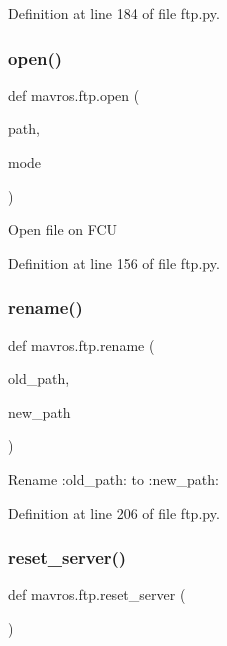 Definition at line 184 of file ftp.\+py.

\mbox{\label{namespacemavros_1_1ftp_a6b481ccf77a4b30ba0213d379bac1cd5}} 
\subsubsection{\texorpdfstring{open()}{open()}}
{\footnotesize\ttfamily def mavros.\+ftp.\+open (\begin{DoxyParamCaption}\item[{}]{path,  }\item[{}]{mode }\end{DoxyParamCaption})}

\begin{DoxyVerb}Open file on FCU\end{DoxyVerb}
 

Definition at line 156 of file ftp.\+py.

\mbox{\label{namespacemavros_1_1ftp_aefef8b91d7e0f5b543d1c7b4b2680dfe}} 
\subsubsection{\texorpdfstring{rename()}{rename()}}
{\footnotesize\ttfamily def mavros.\+ftp.\+rename (\begin{DoxyParamCaption}\item[{}]{old\+\_\+path,  }\item[{}]{new\+\_\+path }\end{DoxyParamCaption})}

\begin{DoxyVerb}Rename :old_path: to :new_path:\end{DoxyVerb}
 

Definition at line 206 of file ftp.\+py.

\mbox{\label{namespacemavros_1_1ftp_a58b6c659d54465656c62e9ac5f3ba6e5}} 
\subsubsection{\texorpdfstring{reset\_server()}{reset\_server()}}
{\footnotesize\ttfamily def mavros.\+ftp.\+reset\+\_\+server (\begin{DoxyParamCaption}{ }\end{DoxyParamCaption})}



